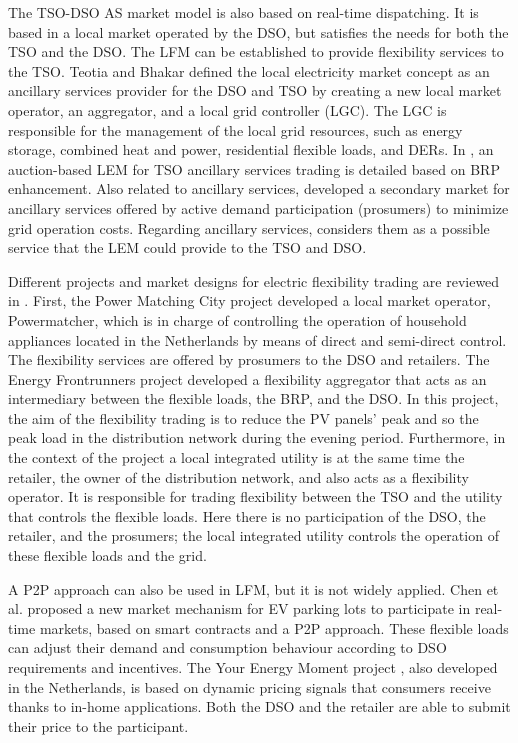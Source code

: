 The TSO-DSO AS market model is also based on real-time dispatching. It is based in a local market operated by the DSO, but satisfies the needs for both the TSO and the DSO. The LFM can be established to provide flexibility services to the TSO. Teotia and Bhakar \cite{teotia2016local} defined the local electricity market concept as an ancillary services provider for the DSO and TSO by creating a new local market operator, an aggregator, and a local grid controller (LGC). The LGC is responsible for the management of the local grid resources, such as energy storage, combined heat and power, residential flexible loads, and DERs. In \cite{rosen2013auction}, an auction-based LEM for TSO ancillary services trading is detailed based on BRP enhancement. Also related to ancillary services, \cite{martinez2013active} developed a secondary market for ancillary services offered by active demand participation (prosumers) to minimize grid operation costs. Regarding ancillary services, \cite{menniti2014future} considers them as a possible service that the LEM could provide to the TSO and DSO.

Different projects and market designs for electric flexibility trading are reviewed in \cite{eid2016market}. First, the Power Matching City project developed a local market operator, Powermatcher, which is in charge of controlling the operation of household appliances located in the Netherlands by means of direct and semi-direct control. 
The flexibility services are offered by prosumers to the DSO and retailers. The Energy Frontrunners project developed a flexibility aggregator that acts as an intermediary between the flexible loads, the BRP, and the DSO. In this project, the aim of the flexibility trading is to reduce the PV panels' peak and so the peak load in the distribution network during the evening period. Furthermore, in the context of the project a local integrated utility is at the same time the retailer, the owner of the distribution network, and also acts as a flexibility operator. It is responsible for trading flexibility between the TSO and the utility that controls the flexible loads. Here there is no participation of the DSO, the retailer, and the prosumers; the local integrated utility controls the operation of these flexible loads and the grid.

A P2P approach can also be used in LFM, but it is not widely applied. Chen et al. \cite{chen2017integrated} proposed a new market mechanism for EV parking lots to participate in real-time markets, based on smart contracts and a P2P approach. These flexible loads can adjust their demand and consumption behaviour according to DSO requirements and incentives. The Your Energy Moment project \cite{eid2016market}, also developed in the Netherlands, is based on dynamic pricing signals that consumers receive thanks to in-home applications. Both the DSO and the retailer are able to submit their price to the participant.

